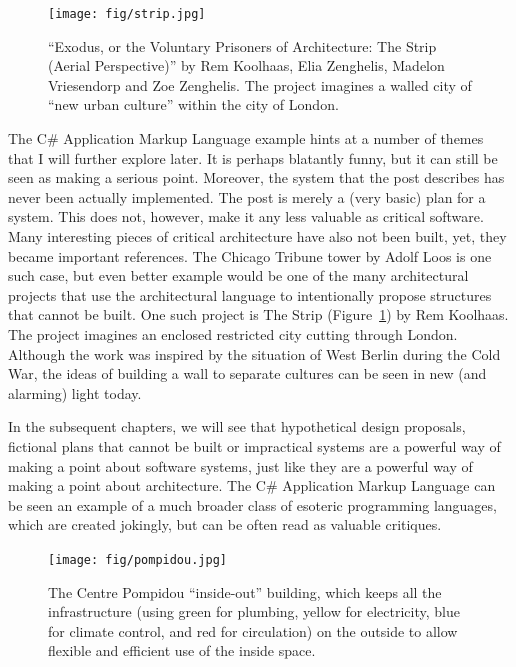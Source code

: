 \begin{figure}
\centering
\texttt{[image: fig/strip.jpg]}\quad
\caption{``Exodus, or the Voluntary Prisoners of Architecture: The Strip (Aerial Perspective)''
by Rem Koolhaas, Elia Zenghelis, Madelon Vriesendorp and Zoe Zenghelis. The project
imagines a walled city of ``new urban culture'' within the city of London.}
\label{fig:exodus}
\end{figure}

The C\# Application Markup Language example hints at a number of themes that I will further
explore later. It is perhaps blatantly funny, but it can still be seen as making a serious point.
Moreover, the system that the post describes has never been actually implemented. The post
is merely a (very basic) plan for a system. This does not, however, make it any less valuable
as critical software. Many interesting pieces of critical architecture have also not been
built, yet, they became important references. The Chicago Tribune tower by Adolf Loos is one
such case, but even better example would be one of the many architectural projects that
use the architectural language to intentionally propose structures that cannot be built.
One such project is The Strip (Figure~\ref{fig:exodus}) by Rem Koolhaas. The project imagines
an enclosed restricted city cutting through London. Although the work was inspired by the
situation of West Berlin during the Cold War, the ideas of building a wall to separate cultures
can be seen in new (and alarming) light today.

In the subsequent chapters, we will see that hypothetical design proposals, fictional
plans that cannot be built or impractical systems are a powerful way of making a point
about software systems, just like they are a powerful way of making a point about architecture.
The C\# Application Markup Language can be seen an example of a much broader class of
esoteric programming languages, which are created jokingly, but can be often read as
valuable critiques.

\begin{figure}
\centering
\texttt{[image: fig/pompidou.jpg]}\quad
\caption{The Centre Pompidou ``inside-out'' building, which keeps all the infrastructure
(using green for plumbing, yellow for electricity, blue for climate control, and red for
circulation) on the outside to allow flexible and efficient use of the inside space.}
\label{fig:pompidou}
\end{figure}

